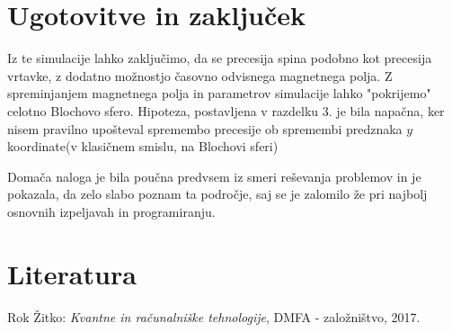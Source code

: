 \documentclass[12pt, a4paper]{article}
\begin{document}
\section{Ugotovitve in zaključek}
Iz te simulacije lahko zaključimo, da se precesija spina podobno kot precesija vrtavke, z dodatno možnostjo časovno odvisnega magnetnega polja. Z spreminjanjem magnetnega polja in parametrov simulacije lahko "pokrijemo" celotno Blochovo sfero. Hipoteza, postavljena v razdelku 3. je bila napačna, ker nisem pravilno upošteval spremembo precesije ob spremembi predznaka $y$ koordinate(v klasičnem smislu, na Blochovi sferi)

Domača naloga je bila poučna predvsem iz smeri reševanja problemov in je pokazala, da zelo slabo poznam ta področje, saj se je zalomilo že pri najbolj osnovnih izpeljavah in programiranju.

\section{Literatura}
Rok Žitko: \textit{Kvantne in računalniške tehnologije}, DMFA - založništvo, 2017.
\end{document}
